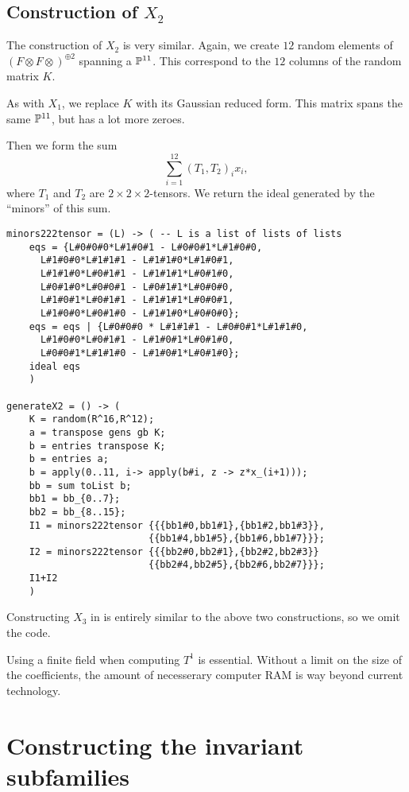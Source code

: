 \subsection{Construction of $X_2$}

The construction of $X_2$ is very similar. Again, we create $12$ random elements of $\left(F \otimes F \otimes \right)^{\oplus 2}$ spanning a $\P^{11}$. This correspond to the $12$ columns of the random matrix $K$.

As with $X_1$, we replace $K$ with its Gaussian reduced form. This matrix spans the same $\P^{11}$, but has a lot more zeroes.

Then we form the sum
\[
\sum_{i=1}^{12} (T_1,T_2)_i x_i,
\]
where $T_1$ and $T_2$ are $2 \times 2 \times 2$-tensors. We return the ideal generated by the ``minors'' of this sum.

\begin{lstlisting}[caption=Code for $X_2$, language=Macaulay2]
minors222tensor = (L) -> ( -- L is a list of lists of lists
    eqs = {L#0#0#0*L#1#0#1 - L#0#0#1*L#1#0#0,
      L#1#0#0*L#1#1#1 - L#1#1#0*L#1#0#1,
      L#1#1#0*L#0#1#1 - L#1#1#1*L#0#1#0,
      L#0#1#0*L#0#0#1 - L#0#1#1*L#0#0#0,
      L#1#0#1*L#0#1#1 - L#1#1#1*L#0#0#1,
      L#1#0#0*L#0#1#0 - L#1#1#0*L#0#0#0};
    eqs = eqs | {L#0#0#0 * L#1#1#1 - L#0#0#1*L#1#1#0,
      L#1#0#0*L#0#1#1 - L#1#0#1*L#0#1#0,
      L#0#0#1*L#1#1#0 - L#1#0#1*L#0#1#0};
    ideal eqs
    )

generateX2 = () -> (
    K = random(R^16,R^12);
    a = transpose gens gb K;
    b = entries transpose K;
    b = entries a;
    b = apply(0..11, i-> apply(b#i, z -> z*x_(i+1)));
    bb = sum toList b;
    bb1 = bb_{0..7};
    bb2 = bb_{8..15};
    I1 = minors222tensor {{{bb1#0,bb1#1},{bb1#2,bb1#3}},
                         {{bb1#4,bb1#5},{bb1#6,bb1#7}}};
    I2 = minors222tensor {{{bb2#0,bb2#1},{bb2#2,bb2#3}}
                         {{bb2#4,bb2#5},{bb2#6,bb2#7}}};
    I1+I2
    )
\end{lstlisting}

Constructing $X_3$ in \MM is entirely similar to the above two constructions, so we omit the code.

\begin{remark}
Using a finite field when computing $T^1$ is essential. Without a limit on the size of the coefficients, the amount of necesserary computer RAM is way beyond current technology.
\end{remark}

\section{Constructing the invariant subfamilies}

